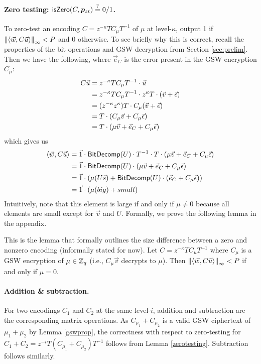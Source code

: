 \paragraph{Zero testing:  $\mathsf{isZero}(C, \bm{p}_{zt}) \stackrel{?}{=} 0/1$.}  To zero-test an encoding $C = z^{-\kappa} T C_\mu T^{-1}$ of $\mu$ at level-$\kappa$, output 1 if $\left\lVert\left<\vec{w}, C\vec{u}\right>\right\rVert_\infty < P$ and 0 otherwise.  To see briefly why this is correct, recall the properties of the bit operations and GSW decryption from Section \ref{sec:prelim}.  Then we have the following, where $\vec{e}_C$ is the error present in the GSW encryption $C_\mu$:
\begin{align*}
C\vec{u} &= z^{-\kappa} T C_\mu T^{-1} \cdot \vec{u}\\
&= z^{-\kappa} T C_\mu  T^{-1} \cdot z^\kappa T\cdot (\vec{v} + \vec{\epsilon})\\
&= (z^{-\kappa} z^{\kappa}) T \cdot C_\mu (\vec{v} + \vec{\epsilon})\\
&= T \cdot (C_\mu\vec{v} + C_\mu\vec{\epsilon})\\
&= T \cdot (\mu \vec{v} + \vec{e}_C + C_\mu\vec{\epsilon})
\end{align*}
which gives us
\begin{align*}
\left<\vec{w}, C\vec{u}\right> &= \vec{1}\cdot\mathsf{BitDecomp}(U)\cdot T^{-1}\cdot T \cdot (\mu \vec{v} + \vec{e}_C + C_\mu\vec{\epsilon})\\
&= \vec{1}\cdot\mathsf{BitDecomp}(U) \cdot (\mu \vec{v} + \vec{e}_C + C_\mu\vec{\epsilon})\\
&= \vec{1}\cdot(\mu(U \vec{s}) + \mathsf{BitDecomp}(U)\cdot (\vec{e}_C + C_\mu\vec{\epsilon}))\\
&= \vec{1}\cdot(\mu(big) + small)
\end{align*} 
Intuitively, note that this element is large if and only if $\mu \not= 0$ because all elements are small except for $\vec{v}$ and $U$.  Formally, we prove the following lemma in the appendix.

\begin{lemma}
\label{zerotesting}
This is the lemma that formally outlines the size difference between a zero and nonzero encoding (informally stated for now).  Let $C = z^{-\kappa} TC_\mu T^{-1}$ where $C_\mu$ is a GSW encryption of $\mu \in \mathbb{Z}_q$ (i.e., $C_\mu\vec{v}$ decrypts to $\mu$).  Then $\left\lVert\left<\vec{w}, C\vec{u}\right>\right\rVert_\infty < P$ if and only if $\mu = 0$.
\end{lemma}

\paragraph{Addition \& subtraction.}  For two encodings $C_1$ and $C_2$ at the same level-$i$, addition and subtraction are the corresponding matrix operations. As $C_{\mu_1}+ C_{\mu_2}$ is a valid GSW ciphertext of $\mu_1 + \mu_2$ by Lemma \ref{gswprop}, the correctness with respect to zero-testing for $C_1 + C_2 = z^{-i}T(C_{\mu_1}+C_{\mu_2})T^{-1}$ follows from Lemma \ref{zerotesting}.  Subtraction follows similarly.

